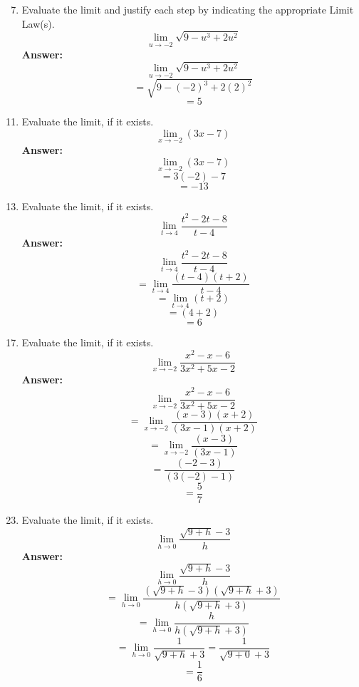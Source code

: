\documentclass[12pt]{article}
\begin{document}
\begin{enumerate}
    \setcounter{enumi}{6}
        \item Evaluate the limit and justify each step by indicating the appropriate Limit Law(s).
        \[ {\displaystyle\lim_{u\to -2} \sqrt{9 - u^3 + 2u^2}} \]
    \textbf{Answer: }
    \[ {\displaystyle\lim_{u\to -2} \sqrt{9 - u^3 + 2u^2}} \]
    \[ = {\displaystyle \sqrt{9 - (-2)^3 + 2(2)^2}} \]
    \[ \boxed{= 5} \]
\end{enumerate}

\begin{enumerate}
    \setcounter{enumi}{10}
        \item  Evaluate the limit, if it exists.
        \[ {\displaystyle\lim_{x\to -2} (3x-7)} \]
    \textbf{Answer: }
    \[ {\displaystyle\lim_{x\to -2} (3x-7)} \]
    \[ = {\displaystyle 3(-2) - 7} \]
    \[ \boxed{ = -13} \]
\end{enumerate}

\begin{enumerate}
    \setcounter{enumi}{12}
        \item  Evaluate the limit, if it exists.
        \[ {\displaystyle\lim_{t\to 4} \frac{t^2-2t-8}{t-4}} \]
    \textbf{Answer: }
    \[ {\displaystyle\lim_{t\to 4} \frac{t^2-2t-8}{t-4}} \]
    \[ = {\displaystyle\lim_{t\to 4} \frac{(t-4)(t+2)}{t-4}} \]
    \[ = {\displaystyle\lim_{t\to 4} (t+2)} \]
    \[ = {\displaystyle (4+2)} \]
    \[ \boxed{= 6} \]
\end{enumerate}

\begin{enumerate}
    \setcounter{enumi}{16}
        \item  Evaluate the limit, if it exists.
        \[ {\displaystyle\lim_{x \to -2} \frac{x^2-x-6}{3x^2 + 5x - 2}} \]
    \textbf{Answer: }
    \[ {\displaystyle\lim_{x \to -2} \frac{x^2-x-6}{3x^2 + 5x - 2}} \]
    \[ = {\displaystyle\lim_{x \to -2} \frac{(x-3)(x+2)}{(3x-1)(x+2)}} \]
    \[ = {\displaystyle\lim_{x \to -2} \frac{(x-3)}{(3x-1)}} \]
    \[ = {\displaystyle \frac{(-2-3)}{(3(-2)-1)}} \]
    \[ \boxed{ = \frac{5}{7}} \]
\end{enumerate}

\begin{enumerate}
    \setcounter{enumi}{22}
        \item  Evaluate the limit, if it exists.
        \[ {\displaystyle\lim_{h \to 0} \frac{\sqrt{9 + h} - 3}{h}} \]
    \textbf{Answer: }
    \[ {\displaystyle\lim_{h \to 0} \frac{\sqrt{9 + h} - 3}{h}} \]
    \[ = {\displaystyle\lim_{h \to 0} \frac{(\sqrt{9 + h} - 3)(\sqrt{9 + h} + 3)}{h(\sqrt{9 + h} + 3)}} \]
    \[ = {\displaystyle\lim_{h \to 0} \frac{h}{h(\sqrt{9 + h} + 3)}} \]
    \[ = {\displaystyle\lim_{h \to 0} \frac{1}{\sqrt{9 + h} + 3}}  = \frac{1}{\sqrt{9 + 0} + 3} \]
    \[ \boxed{ = \frac{1}{6}} \]
\end{enumerate}
\end{document}
